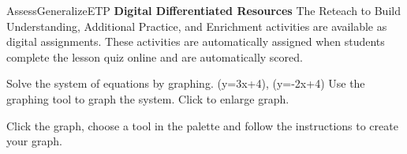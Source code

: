 \documentclass{article}
\newenvironment{te-addendum}[2]{}{}     %
\newcommand{\placeholder}[2]{}          %
\newcommand{\te}[1]{}                   %
\begin{document}
\begin{te-addendum}{Assess}{GeneralizeETP}
\textbf{Digital Differentiated Resources}
The Reteach to Build Understanding, Additional Practice, and Enrichment activities are available as digital assignments. These activities are automatically assigned when students complete the lesson quiz online and are automatically scored.
\te{Digital screen: Exit. Question Help. Help Me Solve This. View an Example. Video. Textbook. Glossary. Math Tools. Print.}
Solve the system of equations by graphing.
(y=3x+4), (y=-2x+4)
Use the graphing tool to graph the system.
Click to enlarge graph.
\placeholder{graph}{Digital practice screenshot: blank square coordinate grid, x,y axes with arrows, both axes from -10 to 10 in unit squares with labels every 2, origin labeled 0; no plotted curves or points. Upper-right part of grid is covered by the Question Help menu.}
Click the graph, choose a tool in the palette and follow the instructions to create your graph.
\te{1 part remaining. Clear All. Check Answer. Review progress. Question 5 of 14. Go. Back. Next. Printed digital example is a linear-linear system.}
\end{te-addendum}
\end{document}

